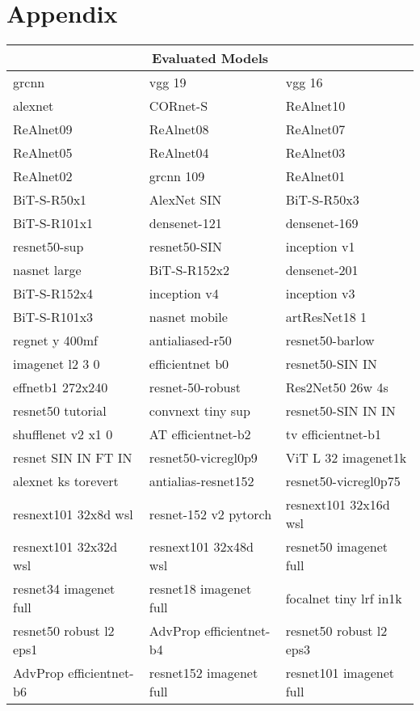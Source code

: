 \newpage\section{Appendix}\label{sec:appendix}
\begin{small}
\begin{tabular}{|p{4.9cm}|p{4.9cm}|p{4.9cm}|}
\toprule
\multicolumn{3}{|c|}{Evaluated Models} \\
\midrule
grcnn & vgg 19 & vgg 16 \\
alexnet & CORnet-S & ReAlnet10 \\
ReAlnet09 & ReAlnet08 & ReAlnet07 \\
ReAlnet05 & ReAlnet04 & ReAlnet03 \\
ReAlnet02 & grcnn 109 & ReAlnet01 \\
BiT-S-R50x1 & AlexNet SIN & BiT-S-R50x3 \\
BiT-S-R101x1 & densenet-121 & densenet-169 \\
resnet50-sup & resnet50-SIN & inception v1 \\
nasnet large & BiT-S-R152x2 & densenet-201 \\
BiT-S-R152x4 & inception v4 & inception v3 \\
BiT-S-R101x3 & nasnet mobile & artResNet18 1 \\
regnet y 400mf & antialiased-r50 & resnet50-barlow \\
imagenet l2 3 0 & efficientnet b0 & resnet50-SIN IN \\
effnetb1 272x240 & resnet-50-robust & Res2Net50 26w 4s \\
resnet50 tutorial & convnext tiny sup & resnet50-SIN IN IN \\
shufflenet v2 x1 0 & AT efficientnet-b2 & tv efficientnet-b1 \\
resnet SIN IN FT IN & resnet50-vicregl0p9 & ViT L 32 imagenet1k \\
alexnet ks torevert & antialias-resnet152 & resnet50-vicregl0p75 \\
resnext101 32x8d wsl & resnet-152 v2 pytorch & resnext101 32x16d wsl \\
resnext101 32x32d wsl & resnext101 32x48d wsl & resnet50 imagenet full \\
resnet34 imagenet full & resnet18 imagenet full & focalnet tiny lrf in1k \\
resnet50 robust l2 eps1 & AdvProp efficientnet-b4 & resnet50 robust l2 eps3 \\
AdvProp efficientnet-b6 & resnet152 imagenet full & resnet101 imagenet full \\

\end{tabular}
\end{small}
